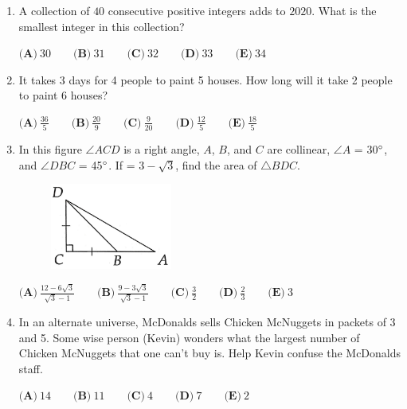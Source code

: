 \documentclass[12pt]{article}
\begin{document}
\begin{enumerate}
     \item A collection of $40$ consecutive positive integers adds to $2020.$ What is the smallest integer in this collection?

    $\textbf{(A)}\ 30 \qquad \textbf{(B)}\ 31 \qquad \textbf{(C)}\ 32\qquad \textbf{(D)}\ 33\qquad \textbf{(E)}\ 34$
    
     \item It takes 3 days for 4 people to paint 5 houses. How long will it take 2 people to paint 6 houses?
     
    $\textbf{(A)}\ \frac{36}{5} \qquad \textbf{(B)}\ \frac{20}{9} \qquad \textbf{(C)}\ \frac{9}{20} \qquad \textbf{(D)}\ \frac{12}{5}\qquad \textbf{(E)}\ \frac{18}{5}$
        
     \item In this figure $\angle ACD$ is a right angle, $A$, $B$, and $C$ are collinear, $\angle A$ = 30$\degree$, and $\angle DBC$ = 45$\degree$. If  = $3-\sqrt{3}$, find the area of $\triangle BDC$.
    \begin{figure}[htp]
        \hspace{1cm}
        \includegraphics[width=4cm]{img1.jpg}
    \end{figure}
    
    $\textbf{(A)}\ \frac{12-6\sqrt{3}}{\sqrt{3}-1} \qquad \textbf{(B)}\ \frac{9-3\sqrt{3}}{\sqrt{3}-1} \qquad \textbf{(C)}\ \frac{3}{2}\qquad \textbf{(D)}\ \frac{2}{3}\qquad \textbf{(E)}\ 3$
        
     \item In an alternate universe, McDonalds sells Chicken McNuggets in packets of 3 and 5. Some wise person (Kevin) wonders what the largest number of Chicken McNuggets that one can't buy is. Help Kevin confuse the McDonalds staff.
    
    $\textbf{(A)}\ 14 \qquad \textbf{(B)}\ 11 \qquad \textbf{(C)}\ 4 \qquad \textbf{(D)}\ 7 \qquad \textbf{(E)}\ 2$
    \end{enumerate}
\end{document}
